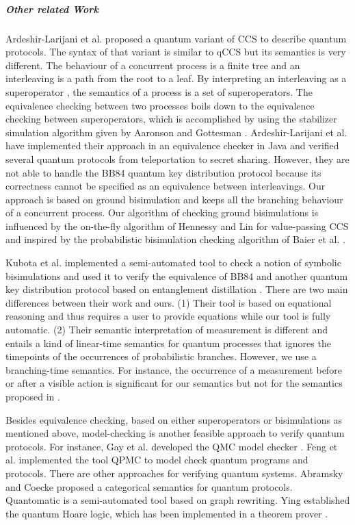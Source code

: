 \documentclass[a4paper,UKenglish,cleveref, autoref]{lipics-v2019}
\begin{document}
\subparagraph*{Other related Work} 
 Ardeshir-Larijani et al. \cite{AL18} proposed a quantum variant of CCS \cite{ccs}  to describe quantum protocols. The syntax of that variant is similar to qCCS but its semantics is very different. The behaviour of a concurrent process is a finite tree and an interleaving is a path from the root to a leaf. By interpreting an interleaving as a superoperator \cite{Sel04}, the semantics of a process is a set of superoperators. The equivalence checking between two processes boils down to the equivalence checking between superoperators, which is accomplished by using the stabilizer simulation algorithm given by Aaronson and Gottesman \cite{AG04}. Ardeshir-Larijani et al. have implemented their approach in an equivalence checker in Java and verified several quantum protocols from teleportation to secret sharing. 
However, they are not able to handle the BB84 quantum key distribution protocol because its correctness cannot be specified as an equivalence between interleavings.
Our approach is based on ground bisimulation and keeps all the branching behaviour of a concurrent process. Our algorithm of checking ground bisimulations is influenced by the on-the-fly algorithm of Hennessy and Lin for value-passing CCS \cite{HL95} and inspired by the probabilistic bisimulation checking algorithm of Baier et al. \cite{BEM00}.

Kubota et al. \cite{KKKKS16}  implemented a semi-automated tool to check a notion of symbolic bisimulations and  used it to verify the equivalence of BB84  and another quantum key distribution protocol based on entanglement distillation \cite{SP00}. There are two main differences between their work and ours. (1) Their tool is based on equational reasoning and thus requires a user to provide equations while our tool is fully automatic. (2) Their semantic interpretation of measurement is different and entails a kind of linear-time semantics for quantum processes that ignores the timepoints of the occurrences of probabilistic branches. However, we use a branching-time semantics. For instance, the occurrence of a measurement before or after a visible action is significant for our semantics but not for the semantics proposed in \cite{KKKKS16}.

Besides equivalence checking, based on either superoperators or bisimulations as mentioned above, model-checking is another feasible approach to verify quantum protocols. For instance, Gay et al. developed the QMC model checker \cite{GNP08}.
Feng et al. implemented  the tool QPMC \cite{FHTZ15} to model check quantum programs and protocols. There are other approaches for verifying quantum systems. Abramsky and Coecke \cite{AC04} proposed a categorical semantics for quantum protocols. Quantomatic \cite{Kis11} is a semi-automated tool based on graph rewriting. Ying \cite{Yin16} established the quantum Hoare logic, which has been implemented in a theorem prover \cite{LLWYZ16}.
\end{document}
